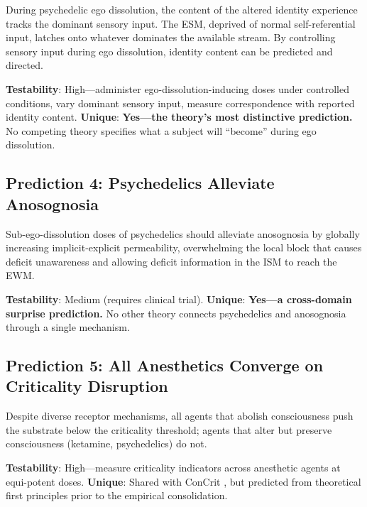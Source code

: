 \documentclass[12pt]{article}
\begin{document}
During psychedelic ego dissolution, the content of the altered identity experience tracks the dominant sensory input. The ESM, deprived of normal self-referential input, latches onto whatever dominates the available stream. By controlling sensory input during ego dissolution, identity content can be predicted and directed.

\textbf{Testability}: High---\hspace{0pt}administer ego-dissolution-inducing doses under controlled conditions, vary dominant sensory input, measure correspondence with reported identity content. \textbf{Unique}: \textbf{Yes---\hspace{0pt}the theory's most distinctive prediction.} No competing theory specifies what a subject will ``become'' during ego dissolution.


\subsection{Prediction 4: Psychedelics Alleviate Anosognosia}

Sub-ego-dissolution doses of psychedelics should alleviate anosognosia by globally increasing implicit-explicit permeability, overwhelming the local block that causes deficit unawareness and allowing deficit information in the ISM to reach the EWM.

\textbf{Testability}: Medium (requires clinical trial). \textbf{Unique}: \textbf{Yes---\hspace{0pt}a cross-domain surprise prediction.} No other theory connects psychedelics and anosognosia through a single mechanism.


\subsection{Prediction 5: All Anesthetics Converge on Criticality Disruption}

Despite diverse receptor mechanisms, all agents that abolish consciousness push the substrate below the criticality threshold; agents that alter but preserve consciousness (ketamine, psychedelics) do not.

\textbf{Testability}: High---\hspace{0pt}measure criticality indicators across anesthetic agents at equi-potent doses. \textbf{Unique}: Shared with ConCrit \citep{AlgomShriki2026}, but predicted from theoretical first principles \citep{Gruber2015} prior to the empirical consolidation.
\end{document}
